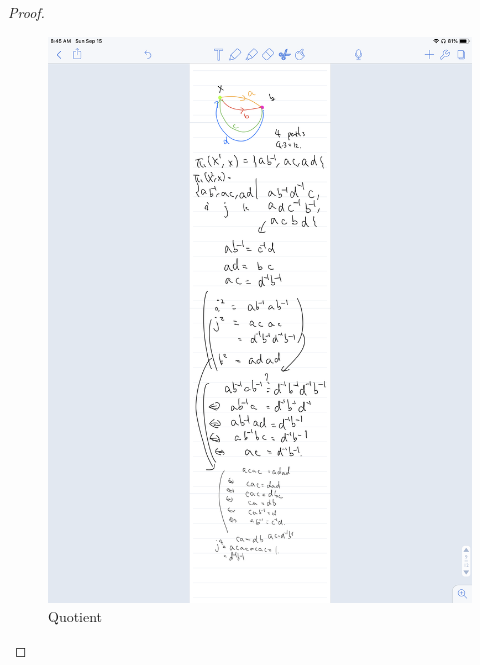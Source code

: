 \documentclass[12pt, psamsfonts]{amsart}
\theoremstyle{definition}
\theoremstyle{remark}
\numberwithin{equation}{section}
\begin{document}
\begin{proof}
\begin{figure}
    \includegraphics[width=.5\linewidth]{fund_cube.jpeg}
    \caption{Quotient}
    \label{fig:fund_cube}
  \end{figure}
\end{proof}
\end{document}
